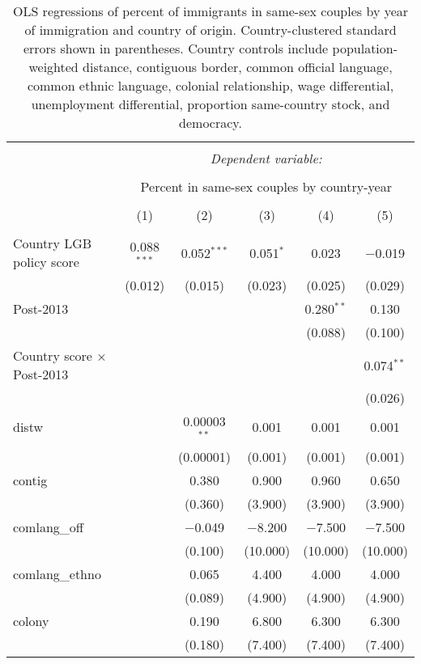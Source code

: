 \documentclass[
  11pt,
]{article}
\begin{document}
\begin{table}[!htbp] \centering 
  \caption{OLS regressions of percent of immigrants in same-sex couples by year of immigration and country of origin. Country-clustered standard errors shown in parentheses. Country controls include population-weighted distance, contiguous border, common official language, common ethnic language, colonial relationship, wage differential, unemployment differential, proportion same-country stock, and democracy.} 
  \label{tab:country-props-full} 
\begin{tabular}{@{\extracolsep{5pt}}lccccc} 
\\[-1.8ex]\hline 
\hline \\[-1.8ex] 
 & \multicolumn{5}{c}{\textit{Dependent variable:}} \\ 
\cline{2-6} 
\\[-1.8ex] & \multicolumn{5}{c}{Percent in same-sex couples by country-year} \\ 
\\[-1.8ex] & (1) & (2) & (3) & (4) & (5)\\ 
\hline \\[-1.8ex] 
 Country LGB policy score & 0.088$^{***}$ & 0.052$^{***}$ & 0.051$^{*}$ & 0.023 & $-$0.019 \\ 
  & (0.012) & (0.015) & (0.023) & (0.025) & (0.029) \\ 
  Post-2013 &  &  &  & 0.280$^{**}$ & 0.130 \\ 
  &  &  &  & (0.088) & (0.100) \\ 
  Country score × Post-2013 &  &  &  &  & 0.074$^{**}$ \\ 
  &  &  &  &  & (0.026) \\ 
  distw &  & 0.00003$^{**}$ & 0.001 & 0.001 & 0.001 \\ 
  &  & (0.00001) & (0.001) & (0.001) & (0.001) \\ 
  contig &  & 0.380 & 0.900 & 0.960 & 0.650 \\ 
  &  & (0.360) & (3.900) & (3.900) & (3.900) \\ 
  comlang\_off &  & $-$0.049 & $-$8.200 & $-$7.500 & $-$7.500 \\ 
  &  & (0.100) & (10.000) & (10.000) & (10.000) \\ 
  comlang\_ethno &  & 0.065 & 4.400 & 4.000 & 4.000 \\ 
  &  & (0.089) & (4.900) & (4.900) & (4.900) \\ 
  colony &  & 0.190 & 6.800 & 6.300 & 6.300 \\ 
  &  & (0.180) & (7.400) & (7.400) & (7.400) \\ 

\end{tabular}
\end{table}
\end{document}
